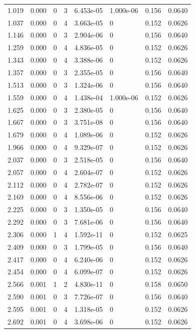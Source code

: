 \documentclass[preview]{standalone}
\begin{document}
{{\begin{tabular}{L{1.2cm}C{1.2cm} C{0.3cm}C{0.5cm} C{1.4cm}C{1.4cm} C{1.4cm}C{1.4cm}}
  1.019  &  0.000  & 0     &  3 &  6.453e-05  & 1.000e-06  & 0.156 &  0.0640   \\ 
  1.037  &  0.000  & 0     &  4 &  3.663e-05  & 0  & 0.152 &  0.0626   \\ 
  1.146  &  0.000  & 0     &  3 &  2.904e-06  & 0  & 0.156 &  0.0640   \\ 
  1.259  &  0.000  & 0     &  4 &  4.836e-05  & 0  & 0.152 &  0.0626   \\ 
  1.343  &  0.000  & 0     &  4 &  3.388e-06  & 0  & 0.152 &  0.0626   \\ 
  1.357  &  0.000  & 0     &  3 &  2.355e-05  & 0  & 0.156 &  0.0640   \\ 
  1.513  &  0.000  & 0     &  3 &  1.324e-06  & 0  & 0.156 &  0.0640   \\ 
  1.559  &  0.000  & 0     &  4 &  1.438e-04  & 1.000e-06  & 0.152 &  0.0626   \\ 
  1.625  &  0.000  & 0     &  3 &  2.380e-05  & 0  & 0.156 &  0.0640   \\ 
  1.667  &  0.000  & 0     &  3 &  3.751e-08  & 0  & 0.156 &  0.0640   \\ 
  1.679  &  0.000  & 0     &  4 &  1.089e-06  & 0  & 0.152 &  0.0626   \\ 
  1.966  &  0.000  & 0     &  4 &  9.329e-07  & 0  & 0.152 &  0.0626   \\ 
  2.037  &  0.000  & 0     &  3 &  2.518e-05  & 0  & 0.156 &  0.0640   \\ 
  2.057  &  0.000  & 0     &  4 &  2.604e-07  & 0  & 0.152 &  0.0626   \\ 
  2.112  &  0.000  & 0     &  4 &  2.782e-07  & 0  & 0.152 &  0.0626   \\ 
  2.169  &  0.000  & 0     &  4 &  8.556e-06  & 0  & 0.152 &  0.0626   \\ 
  2.225  &  0.000  & 0     &  3 &  1.350e-05  & 0  & 0.156 &  0.0640   \\ 
  2.292  &  0.000  & 0     &  3 &  7.681e-06  & 0  & 0.156 &  0.0640   \\ 
  2.306  &  0.000  & 1     &  4 &  1.592e-11  & 0  & 0.152 &  0.0625   \\ 
  2.409  &  0.000  & 0     &  3 &  1.799e-05  & 0  & 0.156 &  0.0640   \\ 
  2.417  &  0.000  & 0     &  4 &  6.240e-06  & 0  & 0.152 &  0.0626   \\ 
  2.454  &  0.000  & 0     &  4 &  6.099e-07  & 0  & 0.152 &  0.0626   \\ 
  2.566  &  0.001  & 1     &  2 &  4.830e-11  & 0  & 0.158 &  0.0650   \\ 
  2.590  &  0.001  & 0     &  3 &  7.726e-07  & 0  & 0.156 &  0.0640   \\ 
  2.595  &  0.001  & 0     &  4 &  1.318e-05  & 0  & 0.152 &  0.0626   \\ 
  2.692  &  0.001  & 0     &  4 &  3.698e-06  & 0  & 0.152 &  0.0626   \\ 
\hline 
\end{tabular} 

}}
\end{document}
